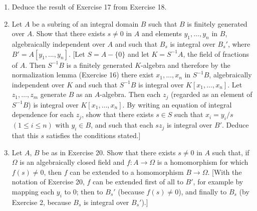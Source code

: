 \begin{enumerate}
Let $x_1,\ldots,x_n$ generate $B$ as a $k$-algebra. The proof is by induction on $n$. If $n=1$ the result is clearly true, so assume $n>1$. Let $A=k[x_1]$ and let $K=k(x_1)$ be the field of fractions of $A$. By the inductive hypothesis, $B$ is a finite algebraic extension of $K$, hence each of $x_2,\ldots,x_n$ satisfies a monic polynomial equation with coefficients in $K$, i.e. coefficients of the form $a/b$ where $a$ and $b$ are in $A$. If $f$ is the product of the denominators of all these coefficients, then each of $x_2,\ldots,x_n$ is integral over $A_f$. Hence $B$ and therefore $K$ is integral over $A_f$.

Suppose $x_1$ is transcendental over $k$. Then $A$ is integrally closed, because it is a unique factorization domain. Hence $A_f$ is integrally closed , and therefore $A_f=K$, which is clearly absurd. Hence $x_1$ is algebraic over $k$, hence $K$ (and therefore $B$) is a finite extension of $k$.

\item Deduce the result of Exercise 17 from Exercise 18.

\item Let $A$ be a subring of an integral domain $B$ such that $B$ is finitely generated over $A$. Show that there exists $s\neq0$ in $A$ and elements $y_1,\ldots,y_n$ in $B$, algebraically independent over $A$ and such that $B_s$ is integral over $B_s'$, where $B'=A[y_1,\ldots,y_n]$. [Let $S=A-\{0\}$ and let $K=S^{-1}A$, the field of fractions of $A$. Then $S^{-1}B$ is a finitely generated $K$-algebra and therefore by the normalization lemma (Exercise 16) there exist $x_1,\ldots,x_n$ in $S^{-1}B$, algebraically independent over $K$ and such that $S^{-1}B$ is integral over $K[x_1,\ldots,x_n]$. Let $z_1,\ldots,z_m$ generate $B$ as an $A$-algebra. Then each $z_j$ (regarded as an element of $S^{-1}B$) is integral over $K[x_1,\ldots,x_n]$. By writing an equation of integral dependence for each $z_j$, show that there exists $s\in S$ such that $x_i=y_i/s$ $(1\leq i\leq n)$ with $y_i\in B$, and such that each $sz_j$ is integral over $B'$. Deduce that this $s$ satisfies the conditions stated.]

\item Let $A$, $B$ be as in Exercise 20. Show that there exists $s\neq0$ in $A$ such that, if $\Omega$ is an algebraically closed field and $f:A\longrightarrow\Omega$ is a homomorphism for which $f(s)\neq0$, then $f$ can be extended to a homomorphism $B\longrightarrow\Omega$. [With the notation of Exercise 20, $f$ can be extended first of all to $B'$, for example by mapping each $y_i$ to $0$; then to $B_s'$ (because $f(s)\neq0$), and finally to $B_s$ (by Exercise 2, because $B_s$ is integral over $B_s'$).]


\end{enumerate}
